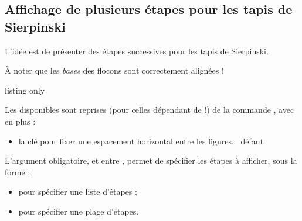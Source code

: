 \begin{PresCodeTexPL}{}
\end{PresCodeTexPL}

\subsection{Affichage de plusieurs étapes pour les tapis de Sierpinski}

\begin{tipblock}
L'idée est de présenter des étapes successives pour les tapis de Sierpinski.

À noter que les \textit{bases} des flocons sont correctement alignées !
\end{tipblock}

\begin{PresCodeTexPL}{listing only}
\end{PresCodeTexPL}

\begin{cautionblock}
Les  disponibles sont reprises (pour celles dépendant de  !) de la commande , avec en plus :

\begin{itemize}
	\item la clé  pour fixer une espacement horizontal entre les figures. \hfill~défaut \Cle{2pt}
\end{itemize}

L'argument obligatoire, et entre , permet de spécifier les étapes à afficher, sous la forme \TikZ{} :

\begin{itemize}
	\item {} pour spécifier une liste d'étapes ;
	\item {} pour spécifier une plage d'étapes.
\end{itemize}
\vspace*{-\baselineskip}\leavevmode
\end{cautionblock}

\begin{PresCodeTexPL}{}
\end{PresCodeTexPL}

\begin{PresCodeTexPL}{}
\end{PresCodeTexPL}

